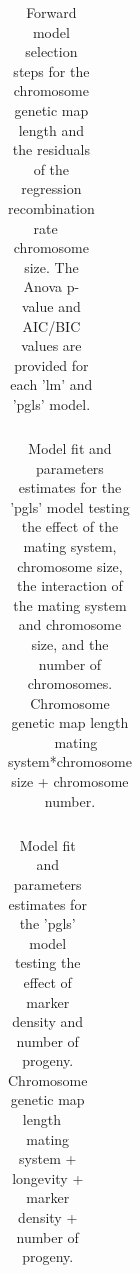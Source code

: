 \documentclass{article}
\begin{document}
\begin{table}[h!]
\centering{}
\caption{Forward model selection steps for the chromosome genetic map length and the residuals of the regression recombination rate ~ chromosome size. The Anova p-value and AIC/BIC values are provided for each 'lm' and 'pgls' model.}
\begin{tabular}{cccccccc}
\end{tabular}
\label{table:tableS2}
\end{table}



\begin{table}[h!]
\centering{}
\caption{Model fit and parameters estimates for the 'pgls' model testing the effect of the mating system, chromosome size, the interaction of the mating system and chromosome size, and the number of chromosomes. Chromosome genetic map length ~ mating system*chromosome size + chromosome number.}
\begin{tabular}{cccccccc}
\end{tabular}
\label{table:tableS3}
\end{table}


\begin{table}[h!]
\centering{}
\caption{Model fit and parameters estimates for the 'pgls' model testing the effect of marker density and number of progeny. Chromosome genetic map length ~ mating system + longevity + marker density + number of progeny.}
\begin{tabular}{cccccccc}
\end{tabular}
\label{table:tableS4}
\end{table}
\end{document}
